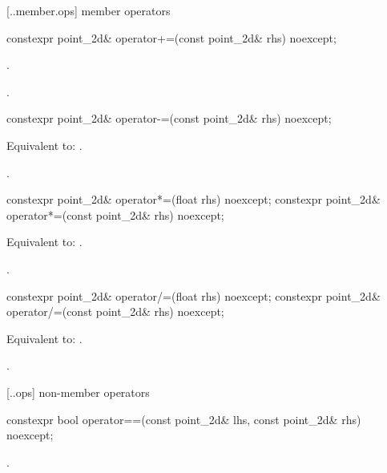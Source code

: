  [\iotwod.\pointtwod.member.ops] { member operators}

%
\begin{itemdecl}
constexpr point_2d& operator+=(const point_2d& rhs) noexcept;
\end{itemdecl}
\begin{itemdescr}
\pnum
\effects
{}.
	
\pnum
\returns
{}.
\end{itemdescr}

%
\begin{itemdecl}
constexpr point_2d& operator-=(const point_2d& rhs) noexcept;
\end{itemdecl}
\begin{itemdescr}
\pnum
\effects
Equivalent to: .

\pnum
\returns
{}.
\end{itemdescr}

%
\begin{itemdecl}
constexpr point_2d& operator*=(float rhs) noexcept;
constexpr point_2d& operator*=(const point_2d& rhs) noexcept;
\end{itemdecl}
\begin{itemdescr}
\pnum
\effects
Equivalent to: .

\pnum
\returns
{}.
\end{itemdescr}

%
\begin{itemdecl}
constexpr point_2d& operator/=(float rhs) noexcept;
constexpr point_2d& operator/=(const point_2d& rhs) noexcept;
\end{itemdecl}
\begin{itemdescr}
\pnum
\effects
Equivalent to: .

\pnum
\returns
{}.
\end{itemdescr}

 [\iotwod.\pointtwod.ops] { non-member operators}

%
\begin{itemdecl}
constexpr bool operator==(const point_2d& lhs, const point_2d& rhs) noexcept;
\end{itemdecl}
\begin{itemdescr}
\pnum
\returns
{}.
\end{itemdescr}


